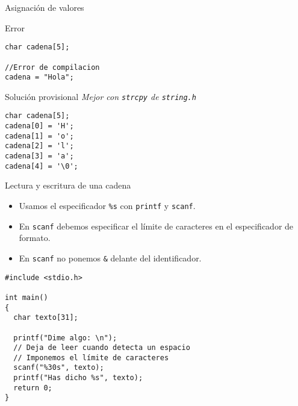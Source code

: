 \documentclass[xcolor={usenames,svgnames,dvipsnames}, aspectratio=169]{beamer}
\begin{document}
\begin{frame}[label={sec:orgf9414a2},fragile]{Asignación de valores}
 \begin{block}{Error}
\lstset{language=C,label= ,caption= ,captionpos=b,numbers=none}
\begin{lstlisting}
char cadena[5];

//Error de compilacion
cadena = "Hola";
\end{lstlisting}
\end{block}

\begin{block}{Solución provisional}
\emph{Mejor con \texttt{strcpy} de \texttt{string.h}}

\lstset{language=C,label= ,caption= ,captionpos=b,numbers=none}
\begin{lstlisting}
char cadena[5]; 
cadena[0] = 'H'; 
cadena[1] = 'o'; 
cadena[2] = 'l'; 
cadena[3] = 'a'; 
cadena[4] = '\0';
\end{lstlisting}
\end{block}
\end{frame}

\begin{frame}[label={sec:org5962f73},fragile]{Lectura y escritura de una cadena}
 \begin{itemize}
\item Usamos el especificador \texttt{\%s} con \texttt{printf} y \texttt{scanf}.

\item En \texttt{scanf} \alert{debemos} especificar el \alert{límite de caracteres} en el especificador de formato.

\item En \texttt{scanf} \alert{no} ponemos \texttt{\&} delante del identificador.
\end{itemize}

\lstset{language=C,label= ,caption= ,captionpos=b,numbers=none}
\begin{lstlisting}
#include <stdio.h>

int main()
{
  char texto[31];

  printf("Dime algo: \n");
  // Deja de leer cuando detecta un espacio
  // Imponemos el límite de caracteres
  scanf("%30s", texto); 
  printf("Has dicho %s", texto);
  return 0;
}
\end{lstlisting}
\end{frame}
\end{document}
